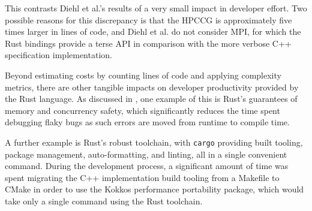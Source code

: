This contrasts Diehl et al.'s results of a very small impact in developer effort. Two possible reasons for this discrepancy is that the HPCCG is approximately five times larger in lines of code, and Diehl et al. do not consider MPI, for which the Rust bindings provide a terse API in comparison with the more verbose C++ specification implementation.

Beyond estimating costs by counting lines of code and applying complexity metrics, there are other tangible impacts on developer productivity provided by the Rust language. As discussed in , one example of this is Rust's guarantees of memory and concurrency safety, which significantly reduces the time spent debugging flaky bugs as such errors are moved from runtime to compile time.

A further example is Rust's robust toolchain, with \texttt{cargo} providing built tooling, package management, auto-formatting, and linting, all in a single convenient command. During the development process, a significant amount of time was spent migrating the C++ implementation build tooling from a Makefile to CMake in order to use the Kokkos performance portability package, which would take only a single command using the Rust toolchain.
